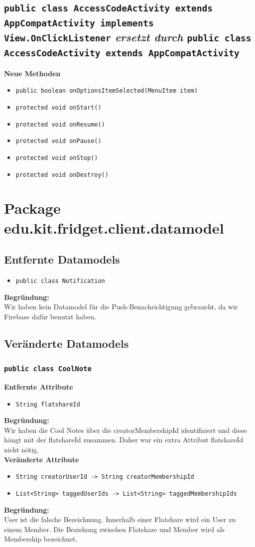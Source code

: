 \documentclass[a4paper]{scrreprt}
\begin{document}
		\subsection{\texttt{public class AccessCodeActivity extends AppCompatActivity implements View.OnClickListener} \textit{ersetzt durch} \texttt{public class AccessCodeActivity extends AppCompatActivity}}
		\textbf{Neue Methoden}
		\begin{itemize}
			\item \texttt{public boolean onOptionsItemSelected(MenuItem item)}
			\item \texttt{protected void onStart()}
			\item \texttt{protected void onResume()}
			\item \texttt{protected void onPause()}
			\item \texttt{protected void onStop()}
			\item \texttt{protected void onDestroy()}
		\end{itemize}
	
		\section{Package edu.kit.fridget.client.datamodel}
	\subsection{Entfernte Datamodels}
	\begin{itemize}
		\item \texttt{public class Notification}
	\end{itemize}
	\textbf{Begründung:}\\
	Wir haben kein Datamodel für die Push-Benachrichtigung gebraucht, da wir Firebase dafür benutzt haben.
	\subsection{Veränderte Datamodels}
	\subsubsection{\texttt{public class CoolNote}}
	\textbf{Entfernte Attribute}
	\begin{itemize}
		\item \texttt{String flatshareId}
	\end{itemize}
	\textbf{Begründung:}\\
	Wir haben die Cool Notes über die creatorMembershipId identifiziert und diese hängt mit der flatshareId zusammen. Daher war ein extra Attribut flatshareId nicht nötig.\\
	\textbf{Veränderte Attribute}
	\begin{itemize}
		\item \texttt{String creatorUserId -> String creatorMembershipId}
		\item \texttt{List<String> taggedUserIds -> List<String> taggedMembershipIds}
	\end{itemize}
	\textbf{Begründung:}\\
	User ist die falsche Bezeichnung. Innerhalb einer Flatshare wird ein User zu einem Member. Die Beziehung zwischen Flatshare und Member wird als Membership bezeichnet.
\end{document}
